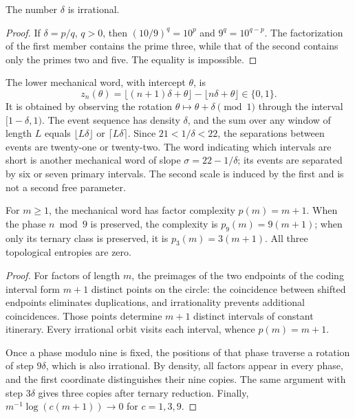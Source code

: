 \begin{lemma}
The number \(\delta\) is irrational.
\end{lemma}
\begin{proof}
If \(\delta=p/q\), \(q>0\), then \((10/9)^q=10^p\) and \(9^q=10^{q-p}\). The factorization of the first member contains the prime three, while that of the second contains only the primes two and five. The equality is impossible.
\end{proof}

The lower mechanical word, with intercept \(\theta\), is
\[
 z_n(\theta)=\lfloor(n+1)\delta+\theta\rfloor-\lfloor n\delta+\theta\rfloor\in\{0,1\}.
\]
It is obtained by observing the rotation \(\theta\mapsto\theta+\delta\pmod1\) through the interval \([1-\delta,1)\). The event sequence has density \(\delta\), and the sum over any window of length \(L\) equals \(\lfloor L\delta\rfloor\) or \(\lceil L\delta\rceil\). Since \(21<1/\delta<22\), the separations between events are twenty-one or twenty-two. The word indicating which intervals are short is another mechanical word of slope \(\sigma=22-1/\delta\); its events are separated by six or seven primary intervals. The second scale is induced by the first and is not a second free parameter.



\begin{theorem}
For \(m\ge1\), the mechanical word has factor complexity \(p(m)=m+1\). When the phase \(n\bmod9\) is preserved, the complexity is \(p_9(m)=9(m+1)\); when only its ternary class is preserved, it is \(p_3(m)=3(m+1)\). All three topological entropies are zero.
\end{theorem}
\begin{proof}
For factors of length \(m\), the preimages of the two endpoints of the coding interval form \(m+1\) distinct points on the circle: the coincidence between shifted endpoints eliminates duplications, and irrationality prevents additional coincidences. Those points determine \(m+1\) distinct intervals of constant itinerary. Every irrational orbit visits each interval, whence \(p(m)=m+1\).

Once a phase modulo nine is fixed, the positions of that phase traverse a rotation of step \(9\delta\), which is also irrational. By density, all factors appear in every phase, and the first coordinate distinguishes their nine copies. The same argument with step \(3\delta\) gives three copies after ternary reduction. Finally, \(m^{-1}\log(c(m+1))\to0\) for \(c=1,3,9\).
\end{proof}

